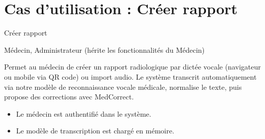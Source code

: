 \documentclass[11pt]{article}
\begin{document}
\section*{Cas d'utilisation : Créer rapport}

\begin{description}[leftmargin=4.2cm, style=nextline]
    \item[Titre de cas d'utilisation] Créer rapport

    \item[Acteurs principaux] Médecin, Administrateur (hérite les fonctionnalités du Médecin)

    \item[Description] Permet au médecin de créer un rapport radiologique par dictée vocale
          (navigateur ou mobile via QR code) ou import audio. Le système transcrit automatiquement
          via notre modèle de reconnaissance vocale médicale, normalise le texte,
          puis propose des corrections avec MedCorrect.

    \item[Préconditions]
    \begin{itemize}[leftmargin=*, nosep]
        \item Le médecin est authentifié dans le système.
        \item Le modèle de transcription est chargé en mémoire.
    \end{itemize}


\end{description}
\end{document}
